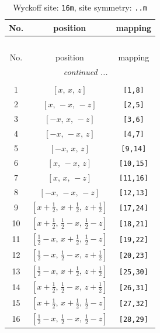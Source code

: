 \documentclass[fleqn,8pt]{jsarticle}
\begin{document}
\renewcommand{\arraystretch}{1.2}
\begin{longtable}{ccc}
\caption{Wyckoff site: {\tt 16m}, site symmetry: {\tt ..m}}
 \\
 \hline \hline
No. & position & mapping \\ \hline \endfirsthead

\multicolumn{2}{l}{\tablename\ \thetable{}} \\
 \hline \hline
No. & position & mapping \\ \hline \endhead

 \hline \hline
\multicolumn{2}{r}{\footnotesize\it continued ...} \\ \endfoot

 \hline \hline
\multicolumn{2}{r}{} \\ \endlastfoot

1 & $\left[ x,\, x,\, z \right]$ & {\tt [1,8]} \\ \hline
2 & $\left[ x,\, - x,\, - z \right]$ & {\tt [2,5]} \\ \hline
3 & $\left[ - x,\, x,\, - z \right]$ & {\tt [3,6]} \\ \hline
4 & $\left[ - x,\, - x,\, z \right]$ & {\tt [4,7]} \\ \hline
5 & $\left[ - x,\, x,\, z \right]$ & {\tt [9,14]} \\ \hline
6 & $\left[ x,\, - x,\, z \right]$ & {\tt [10,15]} \\ \hline
7 & $\left[ x,\, x,\, - z \right]$ & {\tt [11,16]} \\ \hline
8 & $\left[ - x,\, - x,\, - z \right]$ & {\tt [12,13]} \\ \hline
9 & $\left[ x + \frac{1}{2},\, x + \frac{1}{2},\, z + \frac{1}{2} \right]$ & {\tt [17,24]} \\ \hline
10 & $\left[ x + \frac{1}{2},\, \frac{1}{2} - x,\, \frac{1}{2} - z \right]$ & {\tt [18,21]} \\ \hline
11 & $\left[ \frac{1}{2} - x,\, x + \frac{1}{2},\, \frac{1}{2} - z \right]$ & {\tt [19,22]} \\ \hline
12 & $\left[ \frac{1}{2} - x,\, \frac{1}{2} - x,\, z + \frac{1}{2} \right]$ & {\tt [20,23]} \\ \hline
13 & $\left[ \frac{1}{2} - x,\, x + \frac{1}{2},\, z + \frac{1}{2} \right]$ & {\tt [25,30]} \\ \hline
14 & $\left[ x + \frac{1}{2},\, \frac{1}{2} - x,\, z + \frac{1}{2} \right]$ & {\tt [26,31]} \\ \hline
15 & $\left[ x + \frac{1}{2},\, x + \frac{1}{2},\, \frac{1}{2} - z \right]$ & {\tt [27,32]} \\ \hline
16 & $\left[ \frac{1}{2} - x,\, \frac{1}{2} - x,\, \frac{1}{2} - z \right]$ & {\tt [28,29]} \\
\end{longtable}
\end{document}
